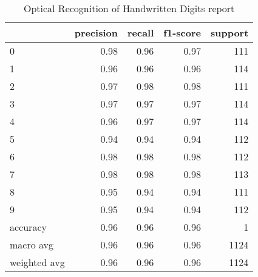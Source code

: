 \begin{table}
\caption{Optical Recognition of Handwritten Digits report}
\begin{tabular}{lrrrr}
\toprule
 & precision & recall & f1-score & support \\
\midrule
0 & 0.98 & 0.96 & 0.97 & 111 \\
1 & 0.96 & 0.96 & 0.96 & 114 \\
2 & 0.97 & 0.98 & 0.98 & 111 \\
3 & 0.97 & 0.97 & 0.97 & 114 \\
4 & 0.96 & 0.97 & 0.97 & 114 \\
5 & 0.94 & 0.94 & 0.94 & 112 \\
6 & 0.98 & 0.98 & 0.98 & 112 \\
7 & 0.98 & 0.98 & 0.98 & 113 \\
8 & 0.95 & 0.94 & 0.94 & 111 \\
9 & 0.95 & 0.94 & 0.94 & 112 \\
accuracy & 0.96 & 0.96 & 0.96 & 1 \\
macro avg & 0.96 & 0.96 & 0.96 & 1124 \\
weighted avg & 0.96 & 0.96 & 0.96 & 1124 \\
\bottomrule
\end{tabular}
\end{table}
